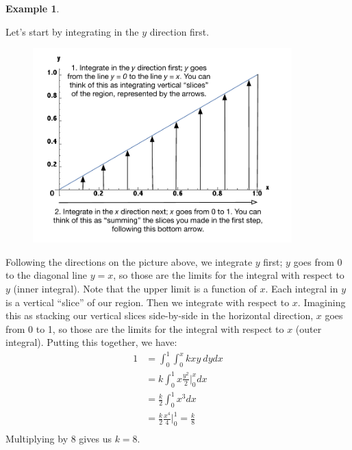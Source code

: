 \documentclass[12pt]{article}
\theoremstyle{definition}
\newtheorem*{example}{Example}
\theoremstyle{remark}
\begin{document}
\begin{example}
\begin{enumerate}
Let's start by integrating in the $y$ direction first. 
\begin{figure}[H]
\centering
\includegraphics[width=10cm]{region1vertfirst.pdf}
\end{figure}
Following the directions on the picture above, we integrate $y$ first; $y$ goes from 0 to the diagonal line $y = x$, so those are the limits for the integral with respect to $y$ (inner integral). Note that the upper limit is a function of $x$. Each integral in $y$ is a vertical ``slice'' of our region. Then we integrate with respect to $x$. Imagining this as stacking our vertical slices side-by-side in the horizontal direction, $x$ goes from 0 to 1, so those are the limits for the integral with respect to $x$ (outer integral). Putting this together, we have:
\begin{align*}
1 &= \int_0^1 \int_0^x k x y \: dy dx \\
&= k \int_0^1 x \frac{y^2}{2} \Bigr|_0^x dx \\
&= \frac{k}{2} \int_0^1 x^3 dx \\
&= \frac{k}{2} \frac{x^4}{4} \Bigr|_0^1 = \frac{k}{8}  \\
\end{align*}
Multiplying by 8 gives us $k = 8$.\\


\end{enumerate}
\end{example}
\end{document}
